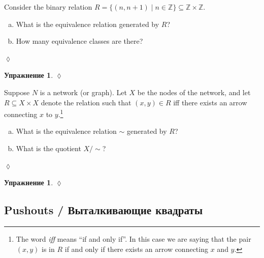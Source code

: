 \documentclass[a4paper]{book}
\def\ZZ{{\mathbb Z}}
\def\ss{\subseteq}
\def\|{{\;|\;}}
\theoremstyle{myth}
\newtheorem{excENG}[envENG]{\begin{english}Exercise\end{english}}
\newenvironment{exerciseENG}{\begin{excENG}}{\hspace*{\fill}$\lozenge$\end{excENG}}
\newtheorem{excRUS}[envRUS]{Упражнение}
\newenvironment{exerciseRUS}{\begin{excRUS}}{\hspace*{\fill}$\lozenge$\end{excRUS}}
\def\sexc{\begin{enumerate}[a.)]\setlength{\itemsep}{.1cm}\setlength{\parskip}{.1cm}\item}
\def\next{\item}
\def\endsexc{\end{enumerate}}
\begin{document}
\begin{russian}
\begin{exerciseENG}
Consider the binary relation $R=\{(n,n+1)\|n\in\ZZ\}\ss\ZZ\times\ZZ$. 
\sexc What is the equivalence relation generated by $R$? 
\next How many equivalence classes are there?
\endsexc
\end{exerciseENG}

\begin{exerciseRUS}
 
\end{exerciseRUS}

\begin{exerciseENG}
Suppose $N$ is a network (or graph). Let $X$ be the nodes of the network, and let $R\ss X\times X$ denote the relation such that $(x,y)\in R$ iff there exists an arrow connecting $x$ to $y$.\footnote{The word {\em iff} means “if and only if”. In this case we are saying that the pair $(x,y)$ is in $R$ if and only if there exists an arrow connecting $x$ and $y$.}
\sexc What is the equivalence relation $\sim$ generated by $R$? 
\next What is the quotient $X/\sim$?
\endsexc
\end{exerciseENG}

\begin{exerciseRUS}
 
\end{exerciseRUS}


\subsection{Pushouts / Выталкивающие квадраты}\label{sec:pushouts}


\end{russian}
\end{document}
